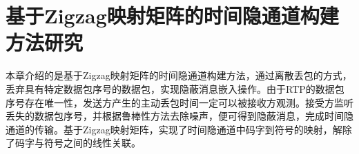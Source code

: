 \chapter{基于Zigzag映射矩阵的时间隐通道构建方法研究}
\label{chap:zigzag}

本章介绍的是基于Zigzag映射矩阵的时间隐通道构建方法，通过离散丢包的方式，丢弃具有特定数据包序号的数据包，实现隐蔽消息嵌入操作。由于RTP的数据包序号存在唯一性，发送方产生的主动丢包时间一定可以被接收方观测。接受方监听丢失的数据包序号，并根据鲁棒性方法去除噪声，便可得到隐蔽消息，完成时间隐通道的传输。基于Zigzag映射矩阵，实现了时间隐通道中码字到符号的映射，解除了码字与符号之间的线性关联。





